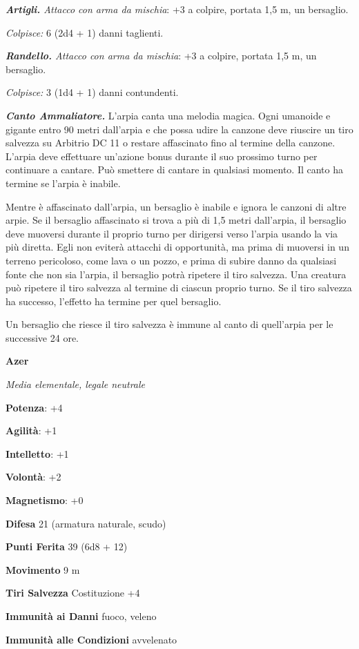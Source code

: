 \begin{multicols}{2}
\emph{\textbf{Artigli.} Attacco con arma da mischia}: +3 a colpire,
portata 1,5 m, un bersaglio.

\emph{Colpisce:} 6 (2d4 + 1) danni taglienti.

\emph{\textbf{Randello.} Attacco con arma da mischia}: +3 a colpire,
portata 1,5 m, un bersaglio.

\emph{Colpisce:} 3 (1d4 + 1) danni contundenti.

\emph{\textbf{Canto Ammaliatore.}} L'arpia canta una melodia magica.
Ogni umanoide e gigante entro 90 metri dall'arpia e che possa udire la
canzone deve riuscire un tiro salvezza su Arbitrio DC 11 o restare
affascinato fino al termine della canzone. L'arpia deve effettuare
un'azione bonus durante il suo prossimo turno per continuare a cantare.
Può smettere di cantare in qualsiasi momento. Il canto ha termine se
l'arpia è inabile.

Mentre è affascinato dall'arpia, un bersaglio è inabile e ignora le
canzoni di altre arpie. Se il bersaglio affascinato si trova a più di
1,5 metri dall'arpia, il bersaglio deve muoversi durante il proprio
turno per dirigersi verso l'arpia usando la via più diretta. Egli non
eviterà attacchi di opportunità, ma prima di muoversi in un terreno
pericoloso, come lava o un pozzo, e prima di subire danno da qualsiasi
fonte che non sia l'arpia, il bersaglio potrà ripetere il tiro salvezza.
Una creatura può ripetere il tiro salvezza al termine di ciascun proprio
turno. Se il tiro salvezza ha successo, l'effetto ha termine per quel
bersaglio.

Un bersaglio che riesce il tiro salvezza è immune al canto di
quell'arpia per le successive 24 ore.

\textbf{Azer}

\emph{Media elementale, legale neutrale}

\textbf{Potenza}: +4

\textbf{Agilità}: +1

\textbf{Intelletto}: +1

\textbf{Volontà}: +2

\textbf{Magnetismo}: +0

\textbf{Difesa} 21 (armatura naturale, scudo)

\textbf{Punti Ferita} 39 (6d8 + 12)

\textbf{Movimento} 9 m

\textbf{Tiri Salvezza} Costituzione +4

\textbf{Immunità ai Danni} fuoco, veleno

\textbf{Immunità alle Condizioni} avvelenato


\end{multicols}
